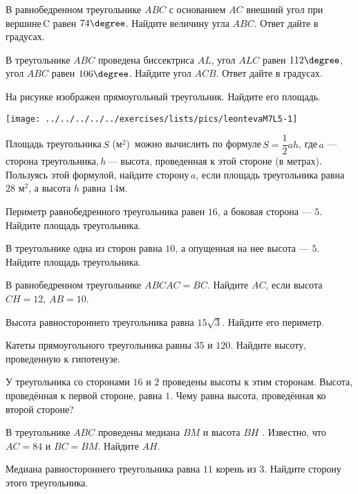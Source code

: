 \begin{class}[number=5]
	\begin{listofex}
		\item В равнобедренном треугольнике \( ABC \) с основанием \( AC \) внешний угол при вершине C равен \( 74\degree \). Найдите величину угла \( ABC \). Ответ дайте в градусах.
		\item В треугольнике \( ABC \) проведена биссектриса \( AL \), угол \( ALC \) равен \( 112\degree \), угол \( ABC \) равен \( 106\degree \). Найдите угол \( ACB \). Ответ дайте в градусах.
		\item 
		\begin{minipage}[t]{\bodywidth}
			На рисунке изображен прямоугольный треугольник. Найдите его площадь.
		\end{minipage}
		\hspace{0.02\linewidth}
		\begin{minipage}[t]{\picwidth}
			\texttt{[image: ../../../../../exercises/lists/pics/leontevaM7L5-1]}
		\end{minipage}
		\item Площадь треугольника \( S \) (м\( ^{2} \))  можно вычислить по формуле \( S= \dfrac{1}{2}ah \),  где \( a \)  — сторона треугольника, \( h  \) — высота, проведенная к этой стороне (в метрах). Пользуясь этой формулой, найдите сторону \( a \), если площадь треугольника равна \( 28 \) м\( ^{2} \), а высота \( h \) равна \( 14  \)м.
		\item Периметр равнобедренного треугольника равен \( 16 \), а боковая сторона  — \( 5 \). Найдите площадь треугольника.
		\item В треугольнике одна из сторон равна \( 10 \), а опущенная на нее высота  — \( 5 \). Найдите площадь треугольника.
		\item В равнобедренном треугольнике \( ABC AC=BC \). Найдите \( AC \), если высота \( CH=12 \), \( AB=10 \).
		\item Высота равностороннего треугольника равна \( 15 \sqrt{3} \). Найдите его периметр.
		\item Катеты прямоугольного треугольника равны \( 35 \) и \( 120 \). Найдите высоту, проведенную к гипотенузе.
		\item У треугольника со сторонами \( 16 \) и \( 2 \) проведены высоты к этим сторонам. Высота, проведённая к первой стороне, равна \( 1 \). Чему равна высота, проведённая ко второй стороне?
		\item В треугольнике \( ABC \) проведены медиана \( BM \) и высота \( BH \) . Известно, что \( AC  =  84 \) и \( BC  =  BM \). Найдите \( AH \).
		\item Медиана равностороннего треугольника равна \( 11 \) корень из \( 3 \). Найдите сторону этого треугольника.
	\end{listofex}
\end{class}


